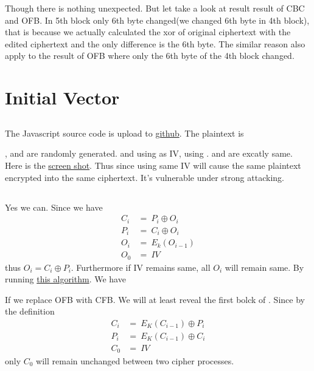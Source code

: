 \documentclass{article}
\begin{document}
Though there is nothing unexpected. But let take a look at result result of CBC and OFB. In 5th block only 6th byte changed(we changed 6th byte in 4th block), that is because we actually calculated the xor of original ciphertext with the edited ciphertext
 and the only difference is the 6th byte. The similar reason also apply to the result of OFB where only the 6th byte of the 4th block changed.
\section{Initial Vector}
\subsection{}
The Javascript source code is upload to
\href{https://github.com/Luna1996/WUSTL/blob/master/571/L2/task41.js}{github}.
The plaintext is
\begin{center}
\end{center}
,  and  are randomly generated.  and  using  as IV,  using .  and  are excatly same. Here is the \href{https://i.loli.net/2018/09/25/5ba9b6889cf97.png}{screen shot}. Thus since using same IV will cause the same plaintext encrypted into the same ciphertext. It's vulnerable under strong attacking.
\subsection{}
Yes we can. Since we have
$$
	\begin{aligned}
		C_i & =\ P_i\oplus O_i \\
		P_i & =\ C_i\oplus O_i \\
		O_i & =\ E_k(O_{i-1})  \\
		O_0 & =\ IV
	\end{aligned}
$$
thus $O_i = C_i\oplus P_i$. Furthermore if IV remains same, all $O_i$ will remain same. By running \href{https://github.com/Luna1996/WUSTL/blob/master/571/L2/task42.js}{this algorithm}. We have
\begin{center}
\end{center}
If we replace OFB with CFB. We will at least reveal the first bolck of . Since by the definition
$$
	\begin{aligned}
		C_i & =\ E_K(C_{i-1})\oplus P_i \\
		P_i & =\ E_K(C_{i-1})\oplus C_i \\
		C_0 & =\ IV
	\end{aligned}
$$
only $C_0$ will remain unchanged between two cipher processes.
\end{document}

